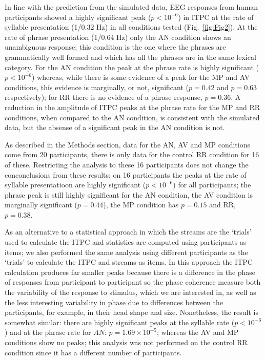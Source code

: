 \documentclass[10pt,letterpaper]{article}
\begin{document}
In line with the prediction from the simulated data, EEG responses
from human participants showed a highly significant peak ($p<10^{-6}$)
in ITPC at the rate of syllable presentation (1/0.32 Hz) in all
conditions tested (Fig.~\ref{fig:Fig2}). At the rate of phrase
presentation (1/0.64 Hz) only the AN condition shows an unambiguous
response; this condition is the one where the phrases are
grammatically well formed and which has all the phrases are in the
same lexical category. For the AN condition the peak at the phrase
rate is highly significant ($p<10^{-6}$) whereas, while there is some
evidence of a peak for the MP and AV conditions, this evidence is
marginally, or not, significant ($p=0.42$ and $p=0.63$ respectively);
for RR there is no evidence of a phrase response, $p=0.36$. A
reduction in the amplitude of ITPC peaks at the phrase rate for the MP
and RR conditions, when compared to the AN condition, is consistent
with the simulated data, but the absense of a significant peak in the
AN condition is not.

As described in the Methods section, data for the AN, AV and MP
conditions come from 20 participants, there is only data for the
control RR condition for 16 of these. Restricting the analysis to
these 16 participants does not change the conconclusions from these
results; on 16 participants the peaks at the rate of syllable
presentatioon are highly significant ($p<10^{-6}$) for all
participants; the phrase peak is still highly significant for the AN
condition, the AV condition is marginally significant ($p=0.44$), the
MP condition has $p=0.15$ and RR, $p=0.38$.

As an alternative to a statistical approach in which the streams are
the `trials' used to calculate the ITPC and statistics are computed
using participants as items; we also performed the same analysis using
different participants as the `trials' to calculate the ITPC and
streams as items. In this approach the ITPC calculation produces far
smaller peaks because there is a difference in the phase of responses
from participant to participant so the phase coherence measure both
the variability of the response to stimulus, which we are interested
in, as well as the less interesting variability in phase due to
differences between the participants, for example, in their head shape
and size. Nonetheless, the result is somewhat similar: there are
highly significant peaks at the syllable rate ($p<10^{-6}$) and at the
phrase rate for $AN$: $p=1.69\times 10^{-5}$; whereas the AV and MP
conditions show no peaks; this analysis was not performed on the
control RR condition since it has a different number of participants.
\end{document}
